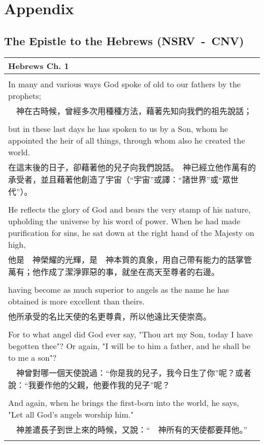 \chapter*{Appendix}
\section*{The Epistle to the Hebrews (NSRV~-~CNV)}
\small
\begin{tabularx}{\textwidth}{p{}}
\hline
Hebrews Ch. 1 \\
\hline \\
In many and various ways God spoke of old to our fathers by the prophets; \\
 　神在古時候，曾經多次用種種方法，藉著先知向我們的祖先說話； \\ \\
but in these last days he has spoken to us by a Son, whom he appointed the heir of all things, through whom also he created the world. \\
 在這末後的日子，卻藉著他的兒子向我們說話。　神已經立他作萬有的承受者，並且藉著他創造了宇宙（“宇宙”或譯：“諸世界”或“眾世代”）。 \\ \\
He reflects the glory of God and bears the very stamp of his nature, upholding the universe by his word of power. When he had made purification for sins, he sat down at the right hand of the Majesty on high, \\
 他是　神榮耀的光輝，是　神本質的真象，用自己帶有能力的話掌管萬有；他作成了潔淨罪惡的事，就坐在高天至尊者的右邊。 \\ \\
having become as much superior to angels as the name he has obtained is more excellent than theirs. \\
 他所承受的名比天使的名更尊貴，所以他遠比天使崇高。 \\ \\
For to what angel did God ever say, "Thou art my Son, today I have begotten thee"? Or again, "I will be to him a father, and he shall be to me a son"? \\
 　神曾對哪一個天使說過：“你是我的兒子，我今日生了你”呢？或者說：“我要作他的父親，他要作我的兒子”呢？ \\ \\
And again, when he brings the first-born into the world, he says, "Let all God's angels worship him." \\
 　神差遣長子到世上來的時候，又說：“　神所有的天使都要拜他。” \\ \\

\end{tabularx}
